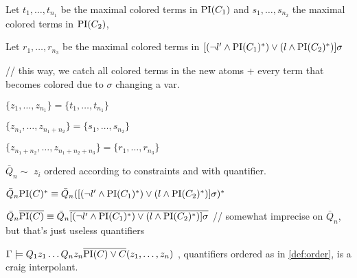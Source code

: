\begin{defi}
\begin{itemize}
\begin{enumerate}
{						Let $t_1, \ldots, t_{n_1}$ be the maximal colored terms in $\mathrm{PI}(C_1)$
						and $s_1, \ldots, s_{n_2}$ the maximal colored terms in $\mathrm{PI}(C_2)$,

						Let $r_1, \ldots, r_{n_3}$ be the maximal colored terms in $[ (\lnot l' \land \mathrm{PI}(C_1)^*) \lor (l \land \mathrm{PI}(C_2)^*) ] \sigma$

						// this way, we catch all colored terms in the new atoms + every term that becomes colored due to $\sigma$ changing a var.


						$\{ z_1, \ldots, z_{n_1} \} = \{t_1, \ldots, t_{n_1}\} $

						$\{ z_{n_1}, \ldots, z_{n_1+n_2} \} = \{s_1, \ldots, s_{n_2}\} $

						$\{ z_{n_1+n_2}, \ldots, z_{n_1+n_2+n_3} \} = \{r_1, \ldots, r_{n_3}\} $

						$\bar Q_n \sim $ $z_i$ ordered according to constraints and with quantifier. 

						$\bar Q_n \mathrm{PI}(C)^* \equiv \bar Q_n  ([ (\lnot l' \land \mathrm{PI}(C_1)^*) \lor (l \land \mathrm{PI}(C_2)^*) ] \sigma)^*$

						$\bar Q_n \overline{\mathrm{PI}(C)} \equiv \bar Q_n  \overline{[ (\lnot l' \land \mathrm{PI}(C_1)^*) \lor (l \land \mathrm{PI}(C_2)^*) ] \sigma}$
// somewhat imprecise on $\bar Q_n$, but that's just useless quantifiers


}

			\end{enumerate}
	\end{itemize}

\end{defi}

\clearpage
\begin{prop}
	$\Gamma \models Q_1 z_1 \ldots Q_n z_n \overline{\mathrm{PI}(C) \lor C}(z_1, \ldots, z_n)$ , quantifiers ordered as in \ref{def:order}, is a craig interpolant.
\end{prop}

